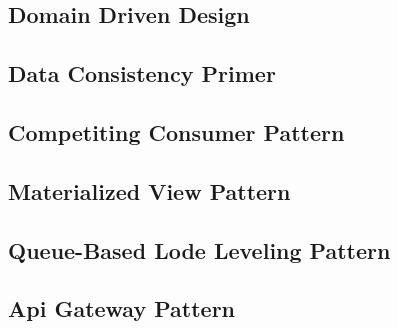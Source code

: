 	\subsection{Domain Driven Design}
	\subsection{Data Consistency Primer}
	\subsection{Competiting Consumer Pattern}
	\subsection{Materialized View Pattern}
	\subsection{Queue-Based Lode Leveling Pattern}
	\subsection{Api Gateway Pattern}
